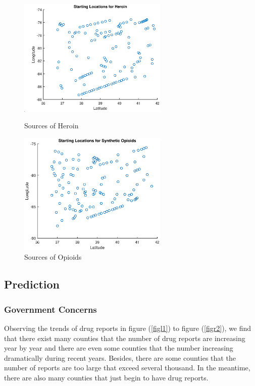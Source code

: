 \documentclass{mcmthesis}
\numberwithin{equation}{section}
\numberwithin{figure}{section}
\numberwithin{table}{section}
\theoremstyle{mydef}
\begin{document}
 \begin{figure}[!htbp]
\begin{minipage}[t]{0.5\linewidth}
\centering
\includegraphics[width=2.8in]{./picture/startlocationhe.eps}
\caption{Sources of Heroin}
\label{fig:left:1}
\end{minipage}%
\begin{minipage}[t]{0.5\linewidth}
\centering
\includegraphics[width=2.8in]{./picture/startlocationso.eps}
\caption{Sources of Opioids}
\label{fig:right:1}
\end{minipage}
\end{figure} 


\subsection{Prediction}

\subsubsection{Government Concerns}

Observing the trends of drug reports in figure (\ref{figl1}) to figure (\ref{figr2}), we find that there exist many counties that the number of drug reports are increasing year by year and there are even some counties that the number increasing dramatically during recent years. Besides, there are some counties that the number of reports are too large that exceed several thousand. In the meantime, there are also many counties that just begin to have drug reports.
\end{document}
